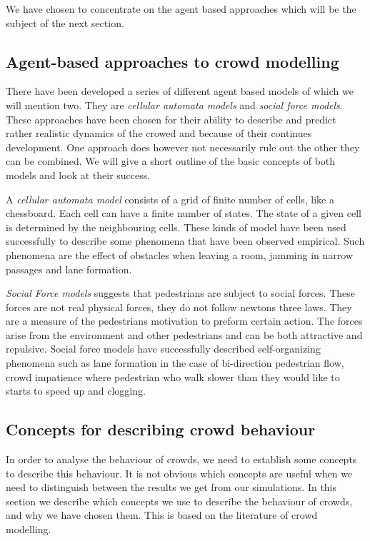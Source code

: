 We have chosen to concentrate on the agent based approaches which will be the subject of the next section.

\subsection{Agent-based approaches to crowd modelling}\label{subsec:ABapproach}
There have been developed a series of different agent based models of which we will mention two. They are \emph{cellular automata models} and \emph{social force models}. These approaches have been chosen for their ability to describe and predict rather realistic dynamics of the crowed and because of their continues development. One approach does however not necessarily rule out the other they can be combined. We will give a short outline of the basic concepts of both models and look at their success.

A \emph{cellular automata model} consists of a grid of finite number of cells, like a chessboard. Each cell can have a finite number of states. The state of a given cell is determined by the neighbouring cells. These kinds of model have been used successfully to describe some phenomena that have been observed empirical. Such phenomena are the effect of obstacles when leaving a room, jamming in narrow passages and lane formation. 

\emph{Social Force models} suggests that pedestrians are subject to social forces. These forces are not real physical forces, they do not follow newtons three laws. They are a measure of the pedestrians motivation to preform certain action. The forces arise from the environment and other pedestrians and can be both attractive and repulsive. Social force models have successfully described self-organizing phenomena such 
as lane formation in the case of bi-direction pedestrian flow, crowd impatience where pedestrian who walk slower than they would like to starts to speed up and clogging. 


\subsection{Concepts for describing crowd behaviour}\label{concepts}
In order to analyse the behaviour of crowds, we need to establish some 
concepts to describe this behaviour. It is not obvious which concepts are 
useful when we need to distinguish between the results we get from our 
simulations. In this section we describe which concepts we use to describe the 
behaviour of crowds, and why we have chosen them. This is based on the 
literature of crowd modelling.

